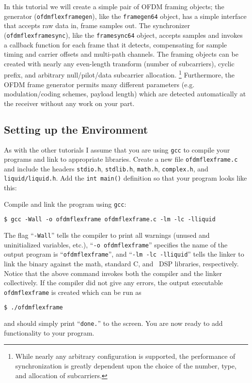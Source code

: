 In this tutorial we will create a simple pair of OFDM framing objects;
the generator ({\tt ofdmflexframegen}),
like the {\tt framegen64} object,
has a simple interface that accepts raw data in, frame samples out.
The synchronizer ({\tt ofdmflexframesync}),
like the {\tt framesync64} object,
accepts samples and invokes a callback function for each frame that it
detects,
compensating for sample timing and carrier offsets and multi-path
channels.
The framing objects can be created with nearly any even-length transform
(number of subcarriers),
cyclic prefix, and arbitrary null/pilot/data subcarrier allocation.%
\footnote{While nearly any arbitrary configuration is supported, the
          performance of synchronization is greatly dependent upon the
          choice of the number, type, and allocation of subcarriers.
          }
Furthermore, the OFDM frame generator permits many different parameters
(e.g. modulation/coding schemes, payload length)
which are detected automatically at the receiver without any work on
your part.


%
%
\subsection{Setting up the Environment}
\label{tutorial:ofdmflexframe:environment}

As with the other tutorials I assume that you are using {\tt gcc} to
compile your programs and link to appropriate libraries.
Create a new file {\tt ofdmflexframe.c} and include the headers
{\tt stdio.h},
{\tt stdlib.h},
{\tt math.h},
{\tt complex.h}, and
{\tt liquid/liquid.h}.
Add the {\tt int main()} definition so that your program looks like
this:
%

%
Compile and link the program using {\tt gcc}:
%
\begin{Verbatim}[fontsize=\small]
    $ gcc -Wall -o ofdmflexframe ofdmflexframe.c -lm -lc -lliquid
\end{Verbatim}
%
The flag ``{\tt -Wall}'' tells the compiler to print all warnings
(unused and uninitialized variables, etc.),
``{\tt -o ofdmflexframe}'' specifies the name of the output program is
``{\tt ofdmflexframe}'', and
``{\tt -lm -lc -lliquid}'' tells the linker to link the binary against
the math, standard C, and \liquid\ DSP libraries, respectively.
Notice that the above command invokes both the compiler and the linker
collectively.
%
If the compiler did not give any errors, the output executable
{\tt ofdmflexframe} is created which can be run as
%
\begin{Verbatim}[fontsize=\small]
    $ ./ofdmflexframe
\end{Verbatim}
%
and should simply print ``{\tt done.}'' to the screen.
You are now ready to add functionality to your program.



